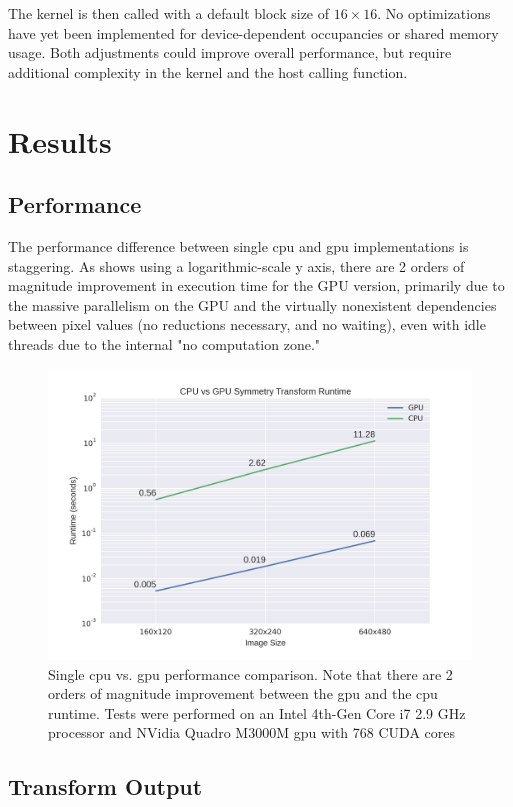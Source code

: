 The kernel is then called with a default block size of \(16\times16\). No optimizations have yet been implemented for device-dependent occupancies or shared memory usage. Both adjustments could improve overall performance, but require additional complexity in the kernel and the host calling function. 

\section{Results}
\label{sec:results}
\subsection{Performance}
\label{sec:performance}

The performance difference between single \gls{cpu} and \gls{gpu} implementations is staggering. As  shows using a logarithmic-scale y axis, there are 2 orders of magnitude improvement in execution time for the GPU version, primarily due to the massive parallelism on the GPU and the virtually nonexistent dependencies between pixel values (\ie no reductions necessary, and no waiting), even with idle threads due to the internal "no computation zone." 

\begin{figure}[htbp]
\centering
\includegraphics[width=0.6\linewidth]{figures/cpu_v_gpu.png}
\caption{\label{fig:perf}
Single \gls{cpu} vs. \gls{gpu} performance comparison. Note that there are 2 orders of magnitude improvement between the \gls{gpu} and the \gls{cpu} runtime. Tests were performed on an Intel 4th-Gen Core i7 2.9 GHz processor and NVidia Quadro M3000M \gls{gpu} with 768 CUDA cores}
\end{figure}

\subsection{Transform Output}
\label{sec:transform-output}

